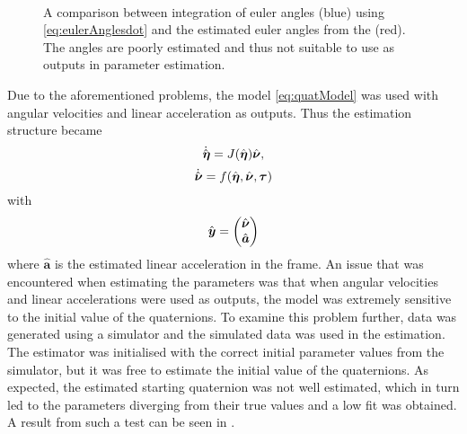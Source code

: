 \begin{figure}[htbp]
  \centering
  \qquad
  \\
  \caption{\label{fig:integratedAngleVelocities}%
  A comparison between integration of euler angles (blue) using \eqref{eq:eulerAnglesdot} and the estimated euler angles from the \abbrEKF (red). The angles are poorly estimated and thus not suitable to use as outputs in parameter estimation.}
\end{figure}

Due to the aforementioned problems, the model \eqref{eq:quatModel} was used with angular velocities and linear acceleration as outputs. Thus the estimation structure became
\begin{equation}
\dot{\hat{\boldsymbol{\eta}}} = J(\hat{\boldsymbol{\eta}}) \hat{\boldsymbol{\nu}},
\end{equation}
\begin{equation}
\dot{\hat{\boldsymbol{\nu}}} =  f(\hat{\boldsymbol{\eta}}, \hat{\boldsymbol{\nu}}, \boldsymbol{\tau})
\end{equation}
with 
\begin{equation}
\hat{\boldsymbol{y}} = \begin{pmatrix}
\hat{\boldsymbol{\nu}} \\
\hat{\boldsymbol{a}}
\end{pmatrix}
\end{equation}
where $\hat{\boldsymbol{a}}$ is the estimated linear acceleration in the \abbrROV frame.
An issue that was encountered when estimating the parameters was that when angular velocities and linear accelerations were used as outputs, the model was extremely sensitive to the initial value of the quaternions. To examine this problem further, data was generated using a simulator and the simulated data was used in the estimation. The estimator was initialised with the correct initial parameter values from the simulator, but it was free to estimate the initial value of the quaternions. As expected, the estimated starting quaternion was not well estimated, which in turn led to the parameters diverging from their true values and a low fit was obtained. A result from such a test can be seen in .

